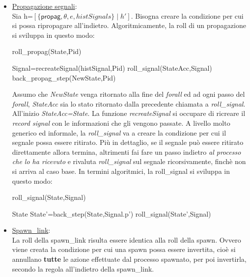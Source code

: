 \documentclass[Contributo.tex]{subfiles}
\begin{document}
	\begin{itemize}
		\item \underline{Propagazione segnali}:\\
		Sia h=$\displaystyle [\{\mathsf{propag},\theta,e,histSignals\} \mid h']$.
		Bisogna creare la condizione per cui si possa ripropagare all'indietro.
		Algoritmicamente, la roll di un propagazione si sviluppa in questo modo:\\
		\begin{algorithm}[H]
		\caption{roll\_propag(State,Pid)}
		\begin{algorithmic}
			\STATE Signal=recreateSignal(histSignal,Pid)
			\STATE roll\_signal(StateAcc,Signal)
		\ENDFOR
		\RETURN back\_propag\_step(NewState,Pid)
		\end{algorithmic}
		\end{algorithm}
		Assumo che \textit{NewState} venga ritornato alla fine del \textit{forall} ed ad ogni passo del \textit{forall}, \textit{StateAcc} sia lo stato ritornato dalla precedente chiamata a \textit{roll\_signal}. All'inizio \textit{StateAcc=State}.
		La funzione \textit{recreateSignal} si occupare di ricreare il \textit{record signal} con le informazioni che gli vengono passate. 
		A livello molto generico ed informale, la \textit{roll\_signal} va a creare la condizione per cui il segnale possa essere ritirato.
		Più in dettaglio, se il segnale può essere ritirato direttamente allora termina, altrimenti fai fare un passo indietro \textit{al processo che lo ha ricevuto} e rivaluta \textit{roll\_signal} sul segnale ricorsivamente, finchè non si arriva al caso base.
		In termini algoritmici, la roll\_signal si sviluppa in questo modo:\\
		\begin{algorithm}[H]
		\caption{roll\_signal(State,Signal)}
		\begin{algorithmic}
		\IF {Signal $\in$ $\Psi$} 
			\RETURN State
		\ELSE
			\STATE State'=back\_step(State,Signal.p')
			\STATE roll\_signal(State',Signal)
		\ENDIF
		\end{algorithmic}
		\end{algorithm}
		\item \underline{Spawn\_link}:\\
			La roll della spawn\_link risulta essere identica alla roll della spawn.
			Ovvero viene creata la condizione per cui una spawn possa essere invertita, cioè si annullano \textbf{tutte} le azione effettuate dal processo spawnato, per poi invertirla,
			secondo la regola all'indietro della spawn\_link.
	\end{itemize}
\end{document}
